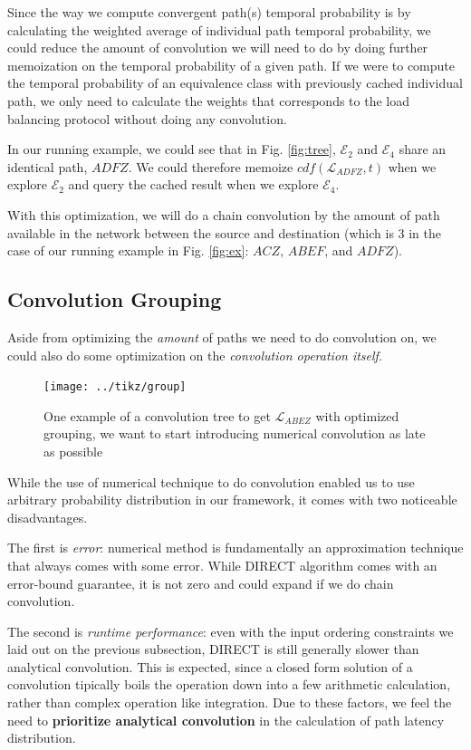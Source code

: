 \documentclass[10pt,sigconf,letterpaper,anonymous,nonacm]{acmart}
\begin{document}
Since the way we compute convergent path(s) temporal probability is by calculating the weighted average of 
individual path temporal probability, we could reduce the amount of convolution we will need to do by doing further memoization 
on the temporal probability of a given path.
If we were to compute the temporal probability of an equivalence class with previously cached individual 
path, we only need to calculate the weights that corresponds to the load balancing protocol without 
doing any convolution.

In our running example, we could see that in Fig. \ref{fig:tree}, $\mathcal{E}_2$ and $\mathcal{E}_4$ share 
an identical path, $ADFZ$.
We could therefore memoize $cdf(\mathcal{L}_{ADFZ}, t)$ when we explore $\mathcal{E}_2$ and query the 
cached result when we explore $\mathcal{E}_4$.

With this optimization, we will do a chain convolution by the amount of path available in the network between 
the source and destination (which is 3 in the case of our running example in Fig. \ref{fig:ex}: $ACZ$, $ABEF$, 
and $ADFZ$).

\subsection{Convolution Grouping}
Aside from optimizing the \textit{amount} of paths we need to do convolution on, we could also do some 
optimization on the \textit{convolution operation itself}. 

\begin{figure}[h]
    \centering
    \texttt{[image: ../tikz/group]}
    \caption{One example of a convolution tree to get $\mathcal{L}_{ABEZ}$ with optimized grouping,
    we want to start introducing numerical convolution as late as possible}
    \label{fig:grouping}
\end{figure}

While the use of numerical technique to do convolution enabled us to use arbitrary probability distribution 
in our framework, it comes with two noticeable disadvantages.

The first is \textit{error}: numerical method is fundamentally an approximation technique that always 
comes with some error. 
While DIRECT algorithm comes with an error-bound guarantee, it is not zero and could expand if we do 
chain convolution.

The second is \textit{runtime performance}: even with the input ordering constraints we laid out on the 
previous subsection, DIRECT is still generally slower than analytical convolution.
This is expected, since a closed form solution of a convolution tipically boils the operation down into 
a few arithmetic calculation, rather than complex operation like integration.
Due to these factors, we feel the need to \textbf{prioritize analytical convolution} in the calculation of 
path latency distribution.
\end{document}
